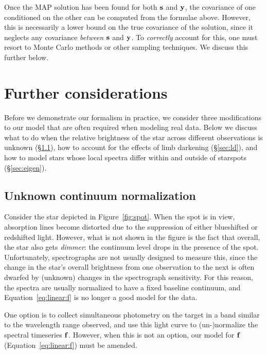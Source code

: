 \documentclass[modern]{aastex62}
\begin{document}
Once the MAP solution has been found for both ${\mathbf{s}}$ and ${\mathbf{y}}$,
the covariance of one conditioned on the other can be computed from the
formulae above. However, this is necessarily a lower bound on the true
covariance of the solution, since it neglects any covariance \emph{between}
${\mathbf{s}}$ and ${\mathbf{y}}$. To \emph{correctly} account for this, one must
resort to Monte Carlo methods or other sampling techniques. We discuss
this further below.


\section{Further considerations}
\label{sec:bellswhistles}

Before we demonstrate our formalism in practice, we consider three
modifications to our model that are often required when modeling real
data. Below we discuss what to do when the relative brightness of the
star across different observations is unknown (\S\ref{sec:norm}), how
to account for the effects of limb darkening (\S\ref{sec:ld}), and how
to model stars whose local spectra differ within and outside of starspots
(\S\ref{sec:eigen}).

\subsection{Unknown continuum normalization}
\label{sec:norm}
%
Consider the star depicted in Figure~\ref{fig:spot}. When the spot is in
view, absorption lines become distorted due to the suppression of either
blueshifted or redshifted light. However, what is not shown in the figure
is the fact that overall, the star also gets \emph{dimmer}: the
continuum level drops in the presence of the spot. Unfortunately,
spectrographs are not usually designed to measure this, since the
change in the star's overall brightness from one observation to the next
is often dwarfed by (unknown) changes in the spectrograph sensitivity.
For this reason, the spectra are usually normalized to have a
fixed baseline continuum, and Equation~\ref{eq:linear:f} is no longer
a good model for the data.

One option is to collect simultaneous photometry on the target in a band
similar to the wavelength range observed, and use this light curve to
(un-)normalize the spectral timeseries ${\mathbf{f}}$. However, when this is
not an option, our model for ${\mathbf{f}}$ (Equation~\ref{eq:linear:f}) must
be amended.
\end{document}
